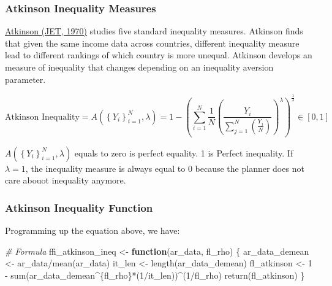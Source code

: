 \documentclass[
]{book}
\newenvironment{Shaded}{\begin{snugshade}}{\end{snugshade}}
\newcommand{\CommentTok}[1]{\textcolor[rgb]{0.56,0.35,0.01}{\textit{#1}}}
\newcommand{\ControlFlowTok}[1]{\textcolor[rgb]{0.13,0.29,0.53}{\textbf{#1}}}
\newcommand{\DecValTok}[1]{\textcolor[rgb]{0.00,0.00,0.81}{#1}}
\newcommand{\FunctionTok}[1]{\textcolor[rgb]{0.00,0.00,0.00}{#1}}
\newcommand{\NormalTok}[1]{#1}
\newcommand{\OtherTok}[1]{\textcolor[rgb]{0.56,0.35,0.01}{#1}}
\newcommand{\SpecialCharTok}[1]{\textcolor[rgb]{0.00,0.00,0.00}{#1}}
\begin{document}
\hypertarget{atkinson-inequality-measures}{%
\subsubsection{Atkinson Inequality Measures}\label{atkinson-inequality-measures}}

\href{https://linkinghub.elsevier.com/retrieve/pii/0022053170900396}{Atkinson (JET, 1970)} studies five standard inequality measures. Atkinson finds that given the same income data across countries, different inequality measure lead to different rankings of which country is more unequal. Atkinson develops an measure of inequality that changes depending on an inequality aversion parameter.

\[
\text{Atkinson Inequality} =
A\left(
\left\{Y_i\right\}_{i=1}^N,
\lambda
\right)
= 1 -
\left(
\sum_{i=1}^N \frac{1}{N}
  \left(
    \frac{Y_i}{\sum_{j=1}^N \left( \frac{Y_j}{N} \right) }
  \right)^{\lambda}
\right)^{\frac{1}{\lambda}}
\in \left[0,1\right]
\]

\(A\left(\left\{Y_i\right\}_{i=1}^N,\lambda\right)\) equals to zero is perfect equality. 1 is Perfect inequality. If \(\lambda=1\), the inequality measure is always equal to 0 because the planner does not care abouot inequality anymore.

\hypertarget{atkinson-inequality-function}{%
\subsubsection{Atkinson Inequality Function}\label{atkinson-inequality-function}}

Programming up the equation above, we have:

\begin{Shaded}
\begin{Highlighting}[]
\CommentTok{\# Formula}
\NormalTok{ffi\_atkinson\_ineq }\OtherTok{\textless{}{-}} \ControlFlowTok{function}\NormalTok{(ar\_data, fl\_rho) \{}
\NormalTok{  ar\_data\_demean }\OtherTok{\textless{}{-}}\NormalTok{ ar\_data}\SpecialCharTok{/}\FunctionTok{mean}\NormalTok{(ar\_data)}
\NormalTok{  it\_len }\OtherTok{\textless{}{-}} \FunctionTok{length}\NormalTok{(ar\_data\_demean)}
\NormalTok{  fl\_atkinson }\OtherTok{\textless{}{-}} \DecValTok{1} \SpecialCharTok{{-}} \FunctionTok{sum}\NormalTok{(ar\_data\_demean}\SpecialCharTok{\^{}}\NormalTok{\{fl\_rho\}}\SpecialCharTok{*}\NormalTok{(}\DecValTok{1}\SpecialCharTok{/}\NormalTok{it\_len))}\SpecialCharTok{\^{}}\NormalTok{(}\DecValTok{1}\SpecialCharTok{/}\NormalTok{fl\_rho)}
  \FunctionTok{return}\NormalTok{(fl\_atkinson)}
\NormalTok{\}}
\end{Highlighting}
\end{Shaded}
\end{document}
